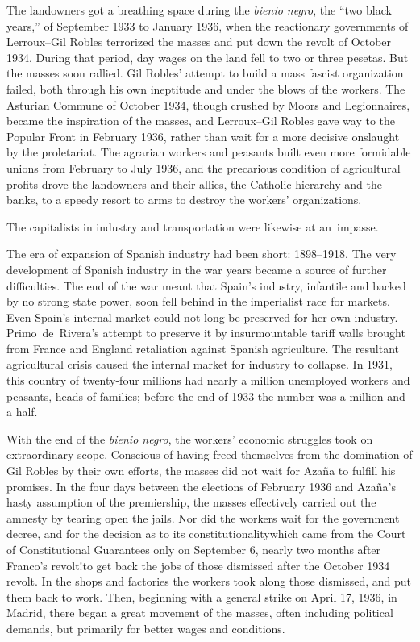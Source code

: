 The landowners got a breathing space during the \emph{bienio negro}{\indexbienionegro}, the ``two black years,'' of September 1933 to January 1936, when the reactionary governments of Lerroux--Gil Robles{\indexALerroux\indexGRobles} terrorized the masses and put down the revolt of October 1934. During that period, day wages on the land fell to two or three pesetas. But the masses soon rallied. Gil Robles’ attempt to build a mass fascist organization failed, both through his own ineptitude and under the blows of the workers. The Asturian Commune of October 1934, though crushed by Moors and Legionnaires, became the inspiration of the masses, and Lerroux--Gil Robles gave way to the Popular Front in February 1936, rather than wait for a more decisive onslaught by the proletariat. The agrarian workers and peasants built even more formidable unions from February to July 1936, and the precarious condition of agricultural profits drove the landowners and their allies, the Catholic hierarchy and the banks, to a speedy resort to arms to destroy the workers’ organizations.

The capitalists in industry and transportation were likewise at an~impasse.

The era of expansion of Spanish industry had been short: 1898--1918. The very development of Spanish industry in the war years became a source of further difficulties. The end of the war meant that Spain’s industry, infantile and backed by no strong state power, soon fell behind in the imperialist race for markets. Even Spain’s internal market could not long be preserved for her own industry. Primo~de~Rivera’s attempt to preserve it by insurmountable tariff walls brought from France and England retaliation against Spanish agriculture. The resultant agricultural crisis caused the internal market for industry to collapse. In 1931, this country of twenty-four millions had nearly a million unemployed workers and peasants, heads of families; before the end of 1933 the number was a million and a half.

With the end of the \emph{bienio negro}, the workers’ economic struggles took on extraordinary scope. Conscious of having freed themselves from the domination of Gil Robles by their own efforts, the masses did not wait for Azaña to fulfill his promises. In the four days between the elections of February 1936 and Azaña’s hasty assumption of the premiership, the masses effectively carried out the amnesty by tearing open the jails. Nor did the workers wait for the government decree, and for the decision as to its constitutionality\textemdash{}which came from the Court of Constitutional Guarantees only on September 6, nearly two months after Franco’s revolt!\textemdash{}to get back the jobs of those dismissed after the October 1934 revolt. In the shops and factories the workers took along those dismissed, and put them back to work. Then, beginning with a general strike on April 17, 1936, in Madrid, there began a great movement of the masses, often including political demands, but primarily for better wages and conditions.

